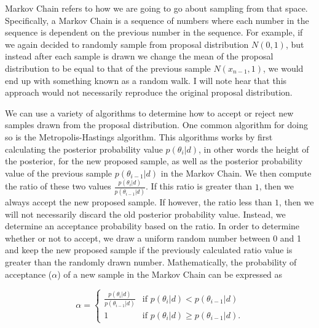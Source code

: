 %
%
Markov Chain refers to how we are going to go about sampling from that space. Specifically, a Markov Chain is a sequence of numbers where each number in the sequence is dependent on the previous number in the sequence. For example, if we again decided to randomly sample from proposal distribution $N(0,1)$, but instead after each sample is drawn we change the mean of the proposal distribution to be equal to that of the previous sample $N(x_{n-1},1)$, we would end up with something known as a random walk. I will note hear that this approach would not necessarily reproduce the original proposal distribution.

%
%

We can use a variety of algorithms to determine how to accept or reject new samples drawn from the proposal distribution. One common algorithm for doing so is the Metropolis-Hastings algorithm. This algorithms works by first calculating the posterior probability value $p(\theta_i|d)$, in other words the height of the posterior, for the new proposed sample, as well as the posterior probability value of the previous sample $p(\theta_{i-1}|d)$ in the Markov Chain. We then compute the ratio of these two values $\frac{p(\theta_i|d)}{p(\theta_{i-1}|d)}$. If this ratio is greater than $1$, then we always accept the new proposed sample. If however, the ratio less than $1$, then we will not necessarily discard the old posterior probability value. Instead, we determine an acceptance probability based on the ratio. In order to determine whether or not to accept, we draw a uniform random number between 0 and 1 and keep the new proposed sample if the previously calculated ratio value is greater than the randomly drawn number. Mathematically, the probability of acceptance ($\alpha$) of a new sample in the Markov Chain can be expressed as

\begin{equation} \label{eq:MCMC_acceptance}
    \alpha = \begin{cases}
  \frac{p(\theta_i|d)}{p(\theta_{i-1}|d)} & \text{if } p(\theta_i|d) < p(\theta_{i-1}|d)\\    
  1 & \text{if } p(\theta_i|d) \ge p(\theta_{i-1}|d).       
  \end{cases}
\end{equation}

